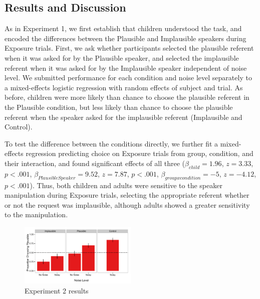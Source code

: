 \documentclass[man,floatsintext]{apa6}
\begin{document}
\subsection{Results and Discussion}

As in Experiment 1, we first establish that children understood the task, and encoded the differences between the Plausible and Implausible speakers during Exposure trials. First, we ask whether participants selected the plausible referent when it was asked for by the Plausible speaker, and selected the implausible referent when it was asked for by the Implausible speaker independent of noise level. We submitted performance for each condition and noise level separately to a mixed-effects logistic regression with random effects of subject and trial. As before, children were more likely than chance to choose the plausible referent in the Plausible condition, but less likely than chance to choose the plausible referent when the speaker asked for the implausible referent (Implausible and Control).  

To test the difference between the conditions directly, we further fit a mixed-effects regression predicting choice on Exposure trials from group, condition, and their interaction, and found significant effects of all three ($\beta_{child} = 1.96$,  $z = 3.33$, $p <.001$, $\beta_{Plausible Speaker} = 9.52$,  $z = 7.87$, $p <.001$,  $\beta_{group x condition} = -5$,  $z = -4.12$, $p <.001$). Thus, both children and adults were sensitive to the speaker manipulation during Exposure trials, selecting the appropriate referent whether or not the request was implausible, although adults showed a greater sensitivity to the manipulation.



\begin{figure}[t]
     \begin{center}
     \includegraphics[width=0.5\textwidth]{figures/exp2_results.pdf}
    \end{center}
    \caption{Experiment 2 results}%
   \label{fig:exp2_results}
\end{figure}

%
\end{document}
